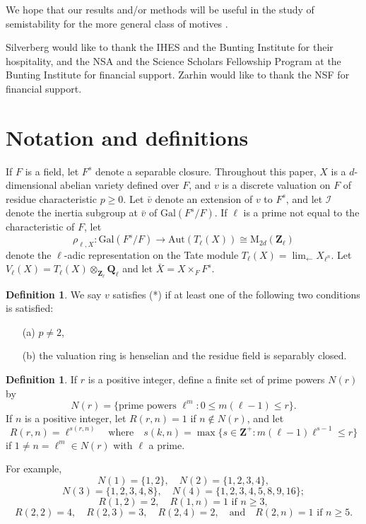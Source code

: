 \documentclass{amsart}
\def\Q{{\mathbf Q}}
\def\Z{{\mathbf Z}}
\def\Gal{\mathrm{Gal}}
\def\Aut{\mathrm{Aut}}
\def\I{{\mathcal I}}
\def\M{\mathrm{M}}
\def\invlim{{\displaystyle{\lim_{\leftarrow}}}}
\theoremstyle{definition}
\newtheorem{defn}[thm]{Definition}
\begin{document}
We hope that our results and/or methods will be useful in the study of
semistability for the more general class of motives
\cite{Motives}.

Silverberg would like to thank the IHES and the Bunting
Institute for their hospitality, and the NSA and the Science Scholars
Fellowship Program at the Bunting Institute for financial support.
Zarhin would like to thank the NSF for financial support. 

\section{Notation and definitions}
\label{notation}

If $F$ is a field, let $F^s$ denote a separable closure. 
Throughout this paper, 
$X$ is a $d$-dimensional abelian variety defined over $F$, and 
$v$ is a discrete valuation on $F$ of residue characteristic $p \ge 0$.
Let ${\bar v}$ denote an extension of $v$ to $F^s$, and 
let $\I$ denote the inertia subgroup at ${\bar v}$ of $\Gal(F^s/F)$.
If $\ell$ is a prime not equal to the characteristic of $F$,
let
$$\rho_{\ell,X} : \Gal(F^s/F) \to \Aut(T_\ell(X)) \cong \M_{2d}(\Z_\ell)$$
denote the $\ell$-adic representation on the Tate module $T_\ell(X)
= \invlim X_{\ell^n}$. 
Let $V_{\ell}(X)=T_\ell(X)\otimes_{\Z_{\ell}}\Q_{\ell}$
and let ${\bar X} = X \times_F F^s$.

\begin{defn}
We say $v$ satisfies (*) if at least one of the following two
conditions is satisfied:
\begin{enumerate}
\item[(a)]  $p \ne 2$, 
\item[(b)] the valuation ring 
is henselian and the residue field is separably closed.
\end{enumerate}
\end{defn}

\begin{defn}
If $r$ is a positive integer, define a finite set 
of prime powers $N(r)$ by 
$$N(r) = \{\text{prime powers $\ell^m : 0 \le m(\ell - 1) \le r $}\}.$$
If $n$ is a positive integer, let $R(r,n) = 1$ if $n \notin N(r)$, 
and let
$$R(r,n) = \ell^{s(r,n)} \quad 
\mbox{where} \quad 
s(k,n) = \max\{s \in \Z^+ : m(\ell - 1)\ell^{s-1} \leq r\}$$
if $1 \neq n = \ell^m \in N(r)$ with $\ell$ a prime.
\end{defn}
For example, $$N(1) = \{1, 2\}, \quad N(2) = \{1, 2, 3, 4\},$$
$$N(3) = \{1, 2, 3, 4, 8\},  \quad  
N(4) = \{1, 2, 3, 4, 5, 8, 9, 16\};$$
$$R(1,2) = 2, \quad \mbox{$R(1,n) = 1 $ if $n \ge 3$},$$
$$R(2,2) = 4, \quad R(2,3) = 3, \quad 
R(2,4) = 2, \quad \mbox{and} \quad \mbox{$R(2,n) = 1$ if $n \ge 5$}.$$
\end{document}
